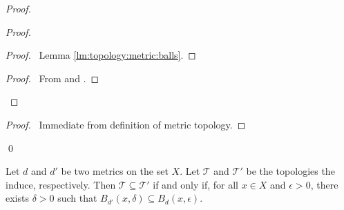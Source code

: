 \begin{proof}
  \pf
  \begin{proof}
    \begin{proof}
      \pf\ Lemma \ref{lm:topology:metric:balls}.
    \end{proof}
    \begin{proof}
      \pf\ From  and .
    \end{proof}
  \end{proof}
  \begin{proof}
    \pf\ Immediate from definition of metric topology.
  \end{proof}
  \qed
\end{proof}

\begin{lm}
  Let $d$ and $d'$ be two metrics on the set $X$. Let $\mathcal{T}$ and
  $\mathcal{T}'$ be the topologies the induce, respectively. Then
  $\mathcal{T} \subseteq \mathcal{T}'$ if and only if, for all $x \in X$ and
  $\epsilon > 0$, there exists $\delta > 0$ such that $B_{d'}(x, \delta)
  \subseteq B_d(x, \epsilon)$.
\end{lm}

